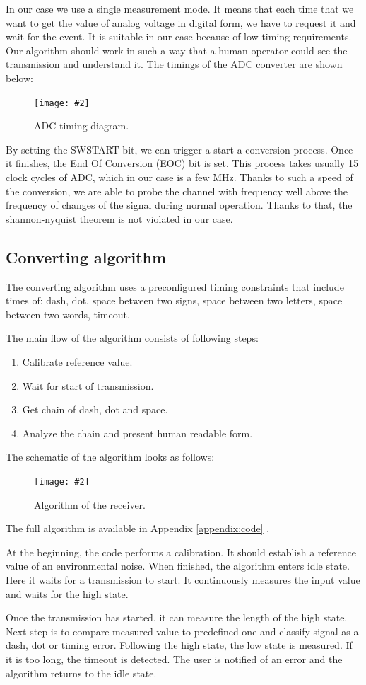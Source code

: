 \documentclass[12pt]{article}
\newcommand{\appendixCodeRef}
{
Appendix \ref{appendix:code}
}
\newcommand{\image}[3]{
\begin{figure}[h]
	\begin{center}
		\texttt{[image: \#2]}
	\end{center}
  \caption{#1}
\end{figure}}
\begin{document}
  In our case we use a single measurement mode. It means that each time that we want to get the value of analog voltage in digital form, we have to request it and wait for the event.
  It is suitable in our case because of low timing requirements. Our algorithm should work in such a way that a human operator could see the transmission and understand it.
  The timings of the ADC converter are shown below:
  
  \image{ADC timing diagram.}{adc_internals.png}{0.4}
  By setting the SWSTART bit, we can trigger a start a conversion process. Once it finishes, the End Of Conversion (EOC) bit is set.
  This process takes usually 15 clock cycles of ADC, which in our case is a few MHz.
  Thanks to such a speed of the conversion, we are able to probe the channel with frequency well above the frequency of changes of the signal during normal
  operation. Thanks to that, the shannon-nyquist theorem is not violated in our case.

  \subsection{Converting algorithm}
  The converting algorithm uses a preconfigured timing constraints that include times of: dash, dot, space between two signs, space between two letters, space between two words, timeout.
  \vspace{10pt}

  The main flow of the algorithm consists of following steps:
  \begin{enumerate}
    \item Calibrate reference value.
    \item Wait for start of transmission.
    \item Get chain of dash, dot and space.
    \item Analyze the chain and present human readable form.
  \end{enumerate}
  The schematic of the algorithm looks as follows:
  \image{Algorithm of the receiver.}{algorithm_receiver.png}{0.4}
  The full algorithm is available in \appendixCodeRef.

  At the beginning, the code performs a calibration. It should establish a reference value of an environmental noise.
  When finished, the algorithm enters idle state. Here it waits for a transmission to start. It continuously measures the input value and waits for the high state.

  Once the transmission has started, it can measure the length of the high state. Next step is to compare measured value to predefined one and classify signal as a dash, dot or timing error.
  Following the high state, the low state is measured. If it is too long, the timeout is detected. The user is notified of an error and the algorithm
  returns to the idle state.
\end{document}
